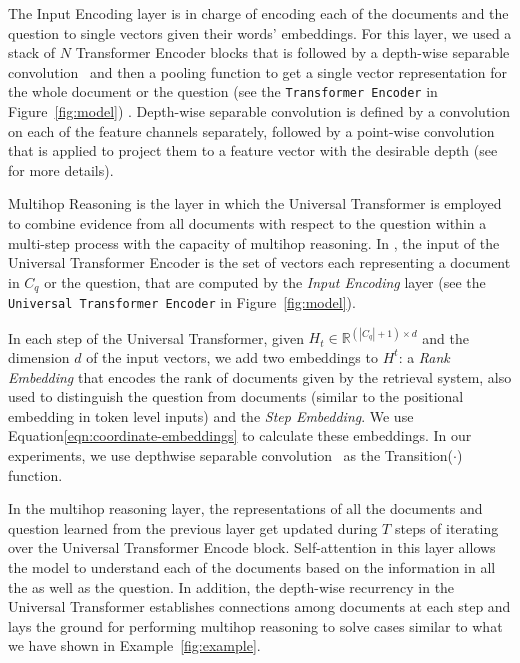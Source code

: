 The Input Encoding layer is in charge of encoding each of the documents and the question to single vectors given their words' embeddings. For this layer, we used a stack of $N$ Transformer Encoder blocks that is followed by a depth-wise separable convolution~\citep{kaiser2017depthwise,chollet2017xception} and then a pooling function to get a single vector representation for the whole document or the question  (see  the \texttt{Transformer Encoder} in Figure~\ref{fig:model}) . 
Depth-wise separable convolution is defined by a convolution on each of the feature channels separately, followed by a point-wise convolution that is applied to project them to a feature vector with the desirable depth (see \citep{chollet2017xception} for more details).

Multihop Reasoning is the layer in which the Universal Transformer is employed to combine evidence from all documents with respect to the question within a multi-step process with the capacity of multihop reasoning.
%
In \tracrnet, the input of the Universal Transformer Encoder is the set of vectors each representing a document in $C_q$ or the question, that are computed by the \emph{Input Encoding} layer  (see  the \texttt{Universal Transformer Encoder} in Figure~\ref{fig:model}). 

In each step of the Universal Transformer, given $H_{t} \in \mathbb{R}^{(|C_q|+1) \times d}$ and the dimension $d$ of the input vectors, we add two embeddings to $H^{t}$: a \emph{Rank Embedding} that encodes the rank of documents given by the retrieval system, also used to distinguish the question from documents (similar to the positional embedding in token level inputs) and the \emph{Step Embedding}. We use Equation\ref{eqn:coordinate-embeddings} to calculate these embeddings.
In our experiments, we use depthwise separable convolution~\cite{chollet2017xception} as the Transition($\cdot$) function.

In the multihop reasoning layer, the representations of all the documents and question learned from the previous layer get updated during $T$ steps of iterating over the Universal Transformer Encode block. 
Self-attention in this layer allows the model to understand each of the documents based on the information in all the as well as the question.
In addition, the depth-wise recurrency in the Universal Transformer establishes connections among documents at each step and lays the ground for performing multihop reasoning to solve cases similar to what we have shown in Example~\ref{fig:example}.

